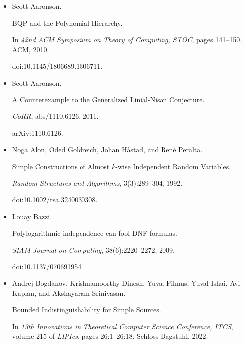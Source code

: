 \documentclass[10pt,a4paper]{article}
\begin{document}
\begin{itemize}


\item[] 
[1]

Scott Aaronson.


BQP and the Polynomial Hierarchy.


In \emph{42nd ACM Symposium on Theory of Computing, STOC}, pages
141–150. ACM, 2010.


doi:10.1145/1806689.1806711.





\item[] 
[2]

Scott Aaronson.


A Counterexample to the Generalized Linial-Nisan
Conjecture.


\emph{CoRR}, abs/1110.6126, 2011.


arXiv:1110.6126.





\item[] 
[3]

Noga Alon, Oded Goldreich, Johan Håstad, and René Peralta.


Simple Constructions of Almost $k$-wise Independent Random
Variables.


\emph{Random Structures and Algorithms}, 3(3):289–304, 1992.


doi:10.1002/rsa.3240030308.





\item[] 
[4]

Louay Bazzi.


Polylogarithmic independence can fool DNF formulas.


\emph{SIAM Journal on Computing}, 38(6):2220–2272, 2009.


doi:10.1137/070691954.





\item[] 
[5]

Andrej Bogdanov, Krishnamoorthy Dinesh, Yuval Filmus, Yuval Ishai, Avi Kaplan,
and Akshayaram Srinivasan.


Bounded Indistinguishability for Simple Sources.


In \emph{13th Innovations in Theoretical Computer Science Conference,
ITCS}, volume 215 of \emph{LIPIcs}, pages 26:1–26:18. Schloss Dagstuhl,
2022.



\end{itemize}
\end{document}
